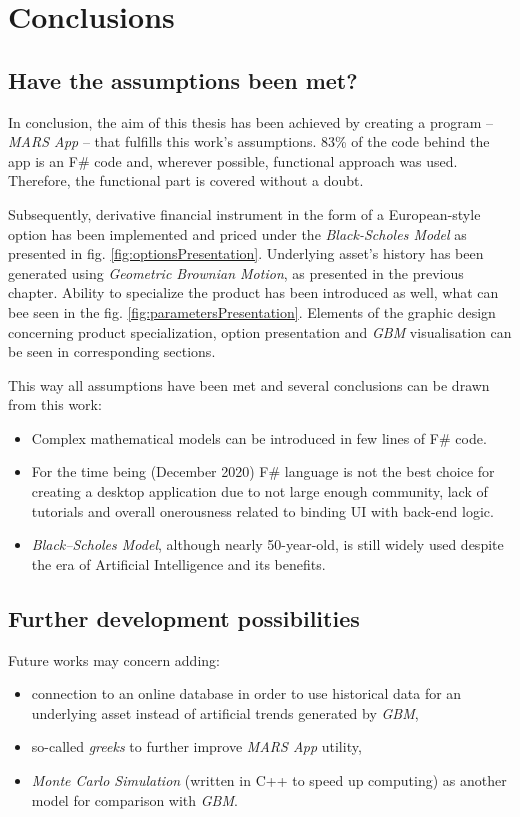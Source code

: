 \chapter{Conclusions}
\section{Have the assumptions been met?}
    In conclusion, the aim of this thesis has been achieved by creating a program -- \textit{MARS App} -- that fulfills this work's assumptions. 83\% of the code behind the app is an F\# code and, wherever possible, functional approach was used. Therefore, the functional part is covered without a doubt.
    
    Subsequently, derivative financial instrument in the form of a European-style option has been implemented and priced under the \textit{Black-Scholes Model} as presented in fig. \ref{fig:optionsPresentation}. Underlying asset's history has been generated using \textit{Geometric Brownian Motion}, as presented in the previous chapter. Ability to specialize the product has been introduced as well, what can bee seen in the fig. \ref{fig:parametersPresentation}. Elements of the graphic design concerning product specialization, option presentation and \textit{GBM} visualisation can be seen in corresponding sections.
    
    This way all assumptions have been met and several conclusions can be drawn from this work:
    \begin{itemize}
        \item Complex mathematical models can be introduced in few lines of F\# code.
        \item For the time being (December 2020) F\# language is not the best choice for creating a desktop application due to not large enough community, lack of tutorials and overall onerousness related to binding UI with back-end logic.
        \item \textit{Black--Scholes Model}, although nearly 50-year-old, is still widely used despite the era of Artificial Intelligence and its benefits.
    \end{itemize}
    
\section{Further development possibilities}
    Future works may concern adding:
    \begin{itemize}

        \item connection to an online database in order to use historical data for an underlying asset instead of artificial trends generated by \textit{GBM},
        \item so-called \textit{greeks} to further improve \textit{MARS App} utility,
        \item \textit{Monte Carlo Simulation} (written in C++ to speed up computing) as another model for comparison with \textit{GBM}.
    \end{itemize}